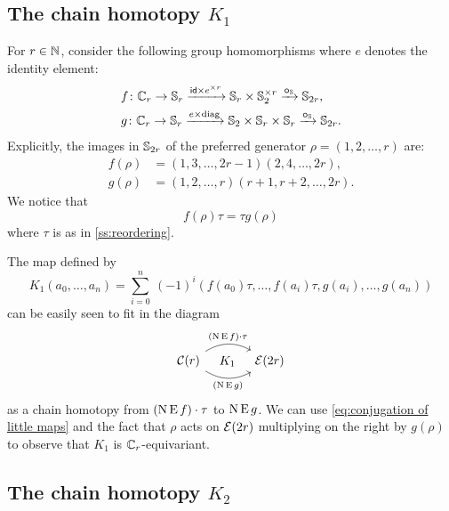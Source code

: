 

\subsection{The chain homotopy $K_1$}

For $r \in \mathbb{N}$, consider the following group homomorphisms where $e$ denotes the identity element:
\[
\begin{split}
	&f \colon \mathbb{C}_r \to \mathbb{S}_r \xrightarrow{\mathsf{id} \times e^{\times r}} \mathbb{S}_r \times \mathbb{S}_2^{\times r} \xrightarrow{\bm{\circ}_{\mathbb{S}}} \mathbb{S}_{2r}, \\
	&g \colon \mathbb{C}_r \to \mathbb{S}_r \xrightarrow{e \times \mathrm{diag}} \mathbb{S}_2 \times \mathbb{S}_r \times \mathbb{S}_r \xrightarrow{\bm{\circ}_{\mathbb{S}}} \mathbb{S}_{2r}.
\end{split}
\]
Explicitly, the images in $\mathbb{S}_{2r}$ of the preferred generator $\rho = (1,2,\dots,r)$ are:
\begin{align*}
	f(\rho) &= (1,3,\dots,2r-1)(2,4,\dots,2r), \\
	g(\rho) &= (1,2,\dots,r)(r+1,r+2,\dots,2r).
\end{align*}
We notice that
\begin{equation}\label{eq:conjugation of little maps}
	f(\rho) \tau = \tau g(\rho)
\end{equation}
where $\tau$ is as in \cref{ss:reordering}.


The map defined by
\[
K_1(a_0,\dots,a_n) =
\sum_{i=0}^n \ (-1)^i (f(a_0) \tau, \dots, f(a_i) \tau, g(a_i), \dots, g(a_n))
\]
can be easily seen to fit in the diagram
\[
\begin{tikzcd}[column sep=large]
	\cC(r)
	\arrow[r,bend left,"(\chains\EE f) \cdot \tau"]
	\arrow[r,bend right,"(\chains\EE g)"']
	\arrow[r,phantom,"K_1"]
	& \BE(2r)
\end{tikzcd}
\]
as a chain homotopy from $(\operatorname{N} \operatorname{E} f) \cdot \tau$ to $\operatorname{N} \operatorname{E} g$.
%
We can use \cref{eq:conjugation of little maps} and the fact that $\rho$ acts on $\mathcal{E}(2r)$ multiplying on the right by $g(\rho)$ to observe that $K_1$ is $\mathbb{C}_r$-equivariant.

\subsection{The chain homotopy $K_2$} \label{ss:coproduct}

